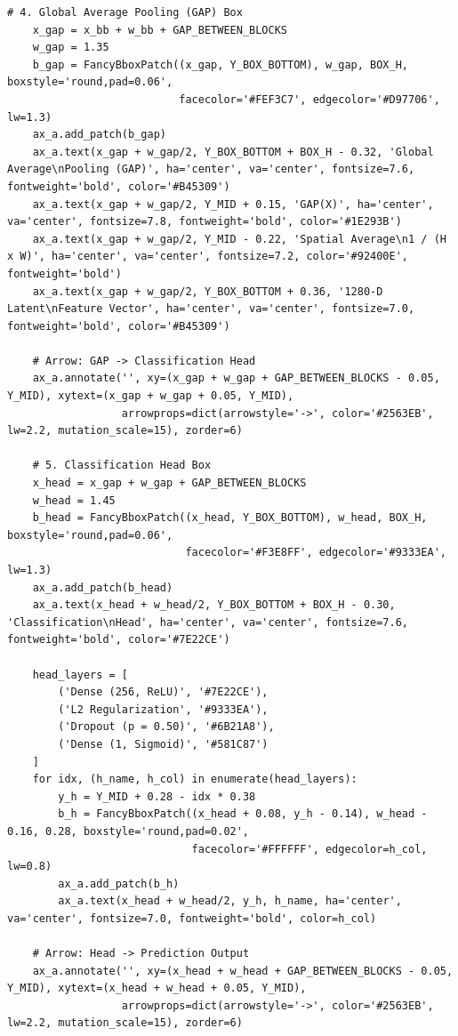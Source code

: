 \begin{lstlisting}[style=pycode]
    # 4. Global Average Pooling (GAP) Box
    x_gap = x_bb + w_bb + GAP_BETWEEN_BLOCKS
    w_gap = 1.35
    b_gap = FancyBboxPatch((x_gap, Y_BOX_BOTTOM), w_gap, BOX_H, boxstyle='round,pad=0.06',
                           facecolor='#FEF3C7', edgecolor='#D97706', lw=1.3)
    ax_a.add_patch(b_gap)
    ax_a.text(x_gap + w_gap/2, Y_BOX_BOTTOM + BOX_H - 0.32, 'Global Average\nPooling (GAP)', ha='center', va='center', fontsize=7.6, fontweight='bold', color='#B45309')
    ax_a.text(x_gap + w_gap/2, Y_MID + 0.15, 'GAP(X)', ha='center', va='center', fontsize=7.8, fontweight='bold', color='#1E293B')
    ax_a.text(x_gap + w_gap/2, Y_MID - 0.22, 'Spatial Average\n1 / (H x W)', ha='center', va='center', fontsize=7.2, color='#92400E', fontweight='bold')
    ax_a.text(x_gap + w_gap/2, Y_BOX_BOTTOM + 0.36, '1280-D Latent\nFeature Vector', ha='center', va='center', fontsize=7.0, fontweight='bold', color='#B45309')

    # Arrow: GAP -> Classification Head
    ax_a.annotate('', xy=(x_gap + w_gap + GAP_BETWEEN_BLOCKS - 0.05, Y_MID), xytext=(x_gap + w_gap + 0.05, Y_MID),
                  arrowprops=dict(arrowstyle='->', color='#2563EB', lw=2.2, mutation_scale=15), zorder=6)

    # 5. Classification Head Box
    x_head = x_gap + w_gap + GAP_BETWEEN_BLOCKS
    w_head = 1.45
    b_head = FancyBboxPatch((x_head, Y_BOX_BOTTOM), w_head, BOX_H, boxstyle='round,pad=0.06',
                            facecolor='#F3E8FF', edgecolor='#9333EA', lw=1.3)
    ax_a.add_patch(b_head)
    ax_a.text(x_head + w_head/2, Y_BOX_BOTTOM + BOX_H - 0.30, 'Classification\nHead', ha='center', va='center', fontsize=7.6, fontweight='bold', color='#7E22CE')

    head_layers = [
        ('Dense (256, ReLU)', '#7E22CE'),
        ('L2 Regularization', '#9333EA'),
        ('Dropout (p = 0.50)', '#6B21A8'),
        ('Dense (1, Sigmoid)', '#581C87')
    ]
    for idx, (h_name, h_col) in enumerate(head_layers):
        y_h = Y_MID + 0.28 - idx * 0.38
        b_h = FancyBboxPatch((x_head + 0.08, y_h - 0.14), w_head - 0.16, 0.28, boxstyle='round,pad=0.02',
                             facecolor='#FFFFFF', edgecolor=h_col, lw=0.8)
        ax_a.add_patch(b_h)
        ax_a.text(x_head + w_head/2, y_h, h_name, ha='center', va='center', fontsize=7.0, fontweight='bold', color=h_col)

    # Arrow: Head -> Prediction Output
    ax_a.annotate('', xy=(x_head + w_head + GAP_BETWEEN_BLOCKS - 0.05, Y_MID), xytext=(x_head + w_head + 0.05, Y_MID),
                  arrowprops=dict(arrowstyle='->', color='#2563EB', lw=2.2, mutation_scale=15), zorder=6)


\end{lstlisting}
